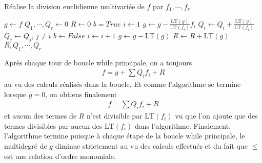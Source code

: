             \begin{algorithm}
                \caption{Réalise la division euclidienne multivariée de $f$ par $f_1, \cdots, f_r$}
                \begin{algorithmic}
                        \State $g \gets f$
                        \State $Q_1, \cdots, Q_r \gets 0$
                        \State $R \gets 0$
                            \State $b = True$
                            \State $i \gets 1$
                                    \State $g \gets g - \frac{\mathrm{LT}(g)}{\mathrm{LT}(f_i)} f_i$
                                    \State $Q_i \gets Q_i + \frac{\mathrm{LT}(g)}{\mathrm{LT}(f_i)}$
                                    \State $Q_j \gets Q_j,\, j \neq i$
                                    \State $b \gets False$
                                \EndIf
                                \State $i \gets i + 1$
                            \EndWhile
                                \State $g \leftarrow g - \mathrm{LT}(g)$
                                \State $R \leftarrow R + \mathrm{LT}(g)$
                            \EndIf
                        \EndWhile
                        \State \Return $R,Q_1, \cdots, Q_r$
                    \EndFunction
                \end{algorithmic}
            \end{algorithm}
            \begin{remq}
                Après chaque tour de boucle while principale, on a toujours 
                \begin{align*}
                    f = g + \sum Q_if_i + R
                \end{align*}
                au vu des calculs réalisés dans la boucle. Et comme l'algorithme se termine lorsque $g = 0$, on obtiens finalement 
                \begin{align*}
                    f = \sum Q_if_i + R
                \end{align*}
                et aucun des termes de $R$ n'est divisible par $\mathrm{LT}(f_i)$ vu que l'on ajoute que des termes divisibles par aucun des $\mathrm{LT}(f_i)$ dans l'algorithme. Finalement, l'algorithme termine puisque à chaque étape de la boucle while principale, le multidegré de $g$ diminue strictement au vu des calculs effectués et du fait que $\leq$ est une relation d'ordre monomiale.
            \end{remq}
